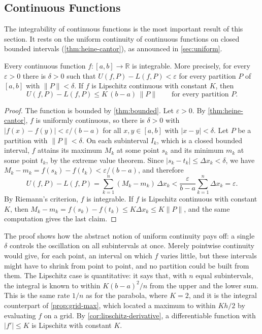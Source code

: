 \subsection{Continuous Functions}

The integrability of continuous functions is the most important result of this section. It rests on the uniform continuity of continuous functions on closed bounded intervals (\cref{thm:heine-cantor}), as announced in \cref{sec:uniform}.

\begin{theorem}
\label{thm:continuous-integrable}
Every continuous function $f\colon[a,b]\to\mathbb R$ is integrable. More precisely, for every $\varepsilon>0$ there is $\delta>0$ such that $U(f,P)-L(f,P)<\varepsilon$ for every partition $P$ of $[a,b]$ with $\|P\|<\delta$. If $f$ is Lipschitz continuous with constant $K$, then
\[
U(f,P)-L(f,P)\le K\,(b-a)\,\|P\|\qquad\text{for every partition }P .
\]
\end{theorem}

\begin{proof}
The function is bounded by \cref{thm:bounded}. Let $\varepsilon>0$. By \cref{thm:heine-cantor}, $f$ is uniformly continuous, so there is $\delta>0$ with $|f(x)-f(y)|<\varepsilon/(b-a)$ for all $x,y\in[a,b]$ with $|x-y|<\delta$. Let $P$ be a partition with $\|P\|<\delta$. On each subinterval $I_k$, which is a closed bounded interval, $f$ attains its maximum $M_k$ at some point $s_k$ and its minimum $m_k$ at some point $t_k$, by the extreme value theorem. Since $|s_k-t_k|\le\Delta x_k<\delta$, we have $M_k-m_k=f(s_k)-f(t_k)<\varepsilon/(b-a)$, and therefore
\[
U(f,P)-L(f,P)=\sum_{k=1}^n(M_k-m_k)\,\Delta x_k<\frac\varepsilon{b-a}\sum_{k=1}^n\Delta x_k=\varepsilon .
\]
By Riemann's criterion, $f$ is integrable. If $f$ is Lipschitz continuous with constant $K$, then $M_k-m_k=f(s_k)-f(t_k)\le K\Delta x_k\le K\|P\|$, and the same computation gives the last claim.
\end{proof}

The proof shows how the abstract notion of uniform continuity pays off: a single $\delta$ controls the oscillation on all subintervals at once. Merely pointwise continuity would give, for each point, an interval on which $f$ varies little, but these intervals might have to shrink from point to point, and no partition could be built from them. The Lipschitz case is quantitative: it says that, with $n$ equal subintervals, the integral is known to within $K(b-a)^2/n$ from the upper and the lower sum. This is the same rate $1/n$ as for the parabola, where $K=2$, and it is the integral counterpart of \cref{prop:grid-max}, which located a maximum to within $Kh/2$ by evaluating $f$ on a grid. By \cref{cor:lipschitz-derivative}, a differentiable function with $|f'|\le K$ is Lipschitz with constant $K$.

